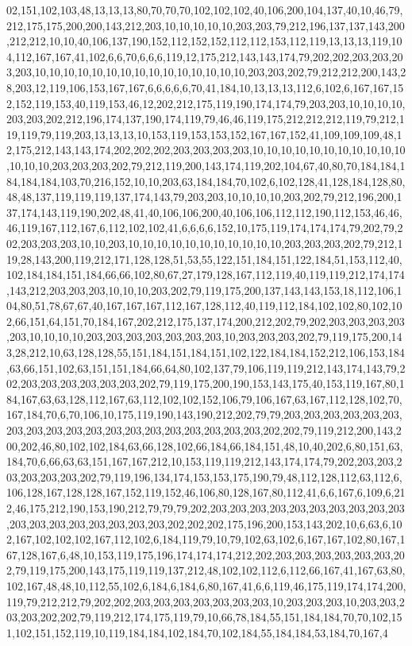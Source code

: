 02,151,102,103,48,13,13,13,80,70,70,70,102,102,102,40,106,200,104,137,40,10,46,79,212,175,175,200,200,143,212,203,10,10,10,10,10,203,203,79,212,196,137,137,143,200,212,212,10,10,40,106,137,190,152,112,152,152,112,112,153,112,119,13,13,13,119,104,112,167,167,41,102,6,6,70,6,6,6,119,12,175,212,143,143,174,79,202,202,203,203,203,203,10,10,10,10,10,10,10,10,10,10,10,10,10,10,10,203,203,202,79,212,212,200,143,28,203,12,119,106,153,167,167,6,6,6,6,6,70,41,184,10,13,13,13,112,6,102,6,167,167,152,152,119,153,40,119,153,46,12,202,212,175,119,190,174,174,79,203,203,10,10,10,10,203,203,202,212,196,174,137,190,174,119,79,46,46,119,175,212,212,212,119,79,212,119,119,79,119,203,13,13,13,10,153,119,153,153,152,167,167,152,41,109,109,109,48,12,175,212,143,143,174,202,202,202,203,203,203,203,10,10,10,10,10,10,10,10,10,10,10,10,10,10,203,203,203,202,79,212,119,200,143,174,119,202,104,67,40,80,70,184,184,184,184,184,103,70,216,152,10,10,203,63,184,184,70,102,6,102,128,41,128,184,128,80,48,48,137,119,119,119,137,174,143,79,203,203,10,10,10,10,203,202,79,212,196,200,137,174,143,119,190,202,48,41,40,106,106,200,40,106,106,112,112,190,112,153,46,46,46,119,167,112,167,6,112,102,102,41,6,6,6,6,152,10,175,119,174,174,174,79,202,79,202,203,203,203,10,10,203,10,10,10,10,10,10,10,10,10,10,10,203,203,203,202,79,212,119,28,143,200,119,212,171,128,128,51,53,55,122,151,184,151,122,184,51,153,112,40,102,184,184,151,184,66,66,102,80,67,27,179,128,167,112,119,40,119,119,212,174,174,143,212,203,203,203,10,10,10,203,202,79,119,175,200,137,143,143,153,18,112,106,104,80,51,78,67,67,40,167,167,167,112,167,128,112,40,119,112,184,102,102,80,102,102,66,151,64,151,70,184,167,202,212,175,137,174,200,212,202,79,202,203,203,203,203,203,10,10,10,10,203,203,203,203,203,203,203,10,203,203,203,202,79,119,175,200,143,28,212,10,63,128,128,55,151,184,151,184,151,102,122,184,184,152,212,106,153,184,63,66,151,102,63,151,151,184,66,64,80,102,137,79,106,119,119,212,143,174,143,79,202,203,203,203,203,203,203,202,79,119,175,200,190,153,143,175,40,153,119,167,80,184,167,63,63,128,112,167,63,112,102,102,152,106,79,106,167,63,167,112,128,102,70,167,184,70,6,70,106,10,175,119,190,143,190,212,202,79,79,203,203,203,203,203,203,203,203,203,203,203,203,203,203,203,203,203,203,203,202,202,79,119,212,200,143,200,202,46,80,102,102,184,63,66,128,102,66,184,66,184,151,48,10,40,202,6,80,151,63,184,70,6,66,63,63,151,167,167,212,10,153,119,119,212,143,174,174,79,202,203,203,203,203,203,203,202,79,119,196,134,174,153,153,175,190,79,48,112,128,112,63,112,6,106,128,167,128,128,167,152,119,152,46,106,80,128,167,80,112,41,6,6,167,6,109,6,212,46,175,212,190,153,190,212,79,79,79,202,203,203,203,203,203,203,203,203,203,203,203,203,203,203,203,203,203,203,202,202,202,175,196,200,153,143,202,10,6,63,6,102,167,102,102,102,167,112,102,6,184,119,79,10,79,102,63,102,6,167,167,102,80,167,167,128,167,6,48,10,153,119,175,196,174,174,174,212,202,203,203,203,203,203,203,202,79,119,175,200,143,175,119,119,137,212,48,102,102,112,6,112,66,167,41,167,63,80,102,167,48,48,10,112,55,102,6,184,6,184,6,80,167,41,6,6,119,46,175,119,174,174,200,119,79,212,212,79,202,202,203,203,203,203,203,203,203,10,203,203,203,10,203,203,203,203,202,202,79,119,212,174,175,119,79,10,66,78,184,55,151,184,184,70,70,102,151,102,151,152,119,10,119,184,184,102,184,70,102,184,55,184,184,53,184,70,167,4